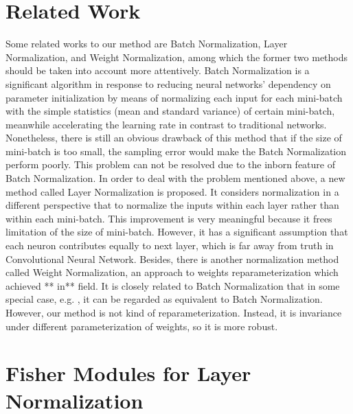 \documentclass{sig-alternate}
\begin{document}
\section{Related Work}
    Some related works to our method are Batch Normalization, Layer Normalization, and Weight Normalization, among which the former two methods should be taken into account more attentively.
    Batch Normalization is a significant algorithm in response to reducing neural networks’ dependency on parameter initialization by means of normalizing each input for each mini-batch with the simple statistics (mean and standard variance) of certain mini-batch, meanwhile accelerating the learning rate in contrast to traditional networks. Nonetheless, there is still an obvious drawback of this method that if the size of mini-batch is too small, the sampling error would make the Batch Normalization perform poorly. This problem can not be resolved due to the inborn feature of Batch Normalization.
    In order to deal with the problem mentioned above, a new method called Layer Normalization is proposed. It considers normalization in a different perspective that to normalize the inputs within each layer rather than within each mini-batch. This improvement is very meaningful because it frees limitation of the size of mini-batch. However, it has a significant assumption that each neuron contributes equally to next layer, which is far away from truth in Convolutional Neural Network.
    Besides, there is another normalization method called Weight Normalization, an approach to weights reparameterization which achieved ** in** field. It is closely related to Batch Normalization that in some special case, e.g. , it can be regarded as equivalent to Batch Normalization. However, our method is not kind of reparameterization. Instead, it is invariance under different parameterization of weights, so it is more robust.

\section{Fisher Modules for Layer Normalization}
\end{document}
